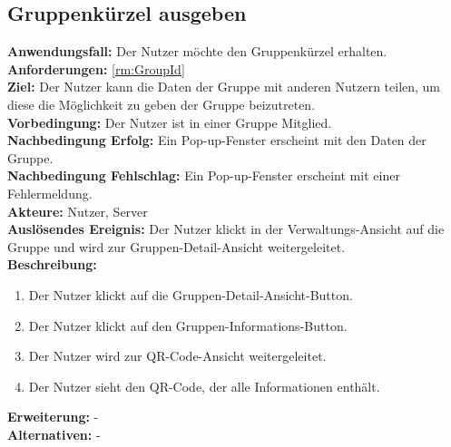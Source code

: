 \documentclass[parskip=full]{scrartcl}
\begin{document}
\subsection{Gruppenkürzel ausgeben}
\textbf{Anwendungsfall:} Der Nutzer möchte den Gruppenkürzel erhalten.\\
\textbf{Anforderungen:} \ref{rm:GroupId}\\
\textbf{Ziel:} Der Nutzer kann die Daten der Gruppe mit anderen Nutzern teilen, um diese die Möglichkeit zu geben der Gruppe beizutreten.\\
\textbf{Vorbedingung:} Der Nutzer ist in einer Gruppe Mitglied.\\
\textbf{Nachbedingung Erfolg:} Ein Pop-up-Fenster erscheint mit den Daten der Gruppe.\\
\textbf{Nachbedingung Fehlschlag:} Ein Pop-up-Fenster erscheint mit einer Fehlermeldung.\\
\textbf{Akteure:} Nutzer, Server \\
\textbf{Auslösendes Ereignis:} Der Nutzer klickt in der Verwaltungs-Ansicht auf die Gruppe und wird zur Gruppen-Detail-Ansicht weitergeleitet.\\
\textbf{Beschreibung:}
\begin{enumerate}
    \item Der Nutzer klickt auf die Gruppen-Detail-Ansicht-Button.
    \item Der Nutzer klickt auf den Gruppen-Informations-Button.
    \item Der Nutzer wird zur QR-Code-Ansicht weitergeleitet.
    \item Der Nutzer sieht den QR-Code, der alle Informationen enthält.
\end{enumerate}
\textbf{Erweiterung:} -\\
\textbf{Alternativen:} -
\newpage
\end{document}
